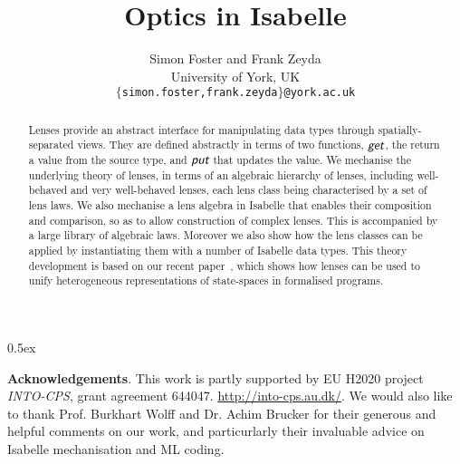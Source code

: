 \documentclass[11pt,a4paper]{article}
\newcommand{\lput}{\textit{\textsf{put}}}
\newcommand{\lget}{\textit{\textsf{get}}}
\begin{document}
\title{Optics in Isabelle}

\author{Simon Foster and Frank Zeyda \\[.5ex] University of York, UK \\[2ex] \texttt{\small $\{$simon.foster,frank.zeyda$\}$@york.ac.uk}}

\maketitle

\begin{abstract}
  Lenses provide an abstract interface for manipulating data types through spatially-separated views. They are defined
  abstractly in terms of two functions, $\lget$, the return a value from the source type, and $\lput$ that updates
  the value. We mechanise the underlying theory of lenses, in terms of an algebraic hierarchy of lenses, including
  well-behaved and very well-behaved lenses, each lens class being characterised by a set of lens laws. We also mechanise 
  a lens algebra in Isabelle that enables their composition and comparison, so as to allow construction of complex lenses.
  This is accompanied by a large library of algebraic laws. Moreover we also show how the lens classes can be applied by 
  instantiating them with a number of Isabelle data types. This theory development is based on our recent paper~\cite{Foster16a}, which
  shows how lenses can be used to unify heterogeneous representations of state-spaces in formalised programs.
\end{abstract}

\tableofcontents

\parindent 0pt\parskip 0.5ex



\vspace{4ex}

\noindent\textbf{Acknowledgements}. This work is partly supported by EU H2020 project \emph{INTO-CPS}, grant agreement
644047. \url{http://into-cps.au.dk/}. We would also like to thank Prof. Burkhart Wolff and Dr. Achim Brucker
for their generous and helpful comments on our work, and particurlarly their invaluable advice on Isabelle
mechanisation and ML coding.



\end{document}
